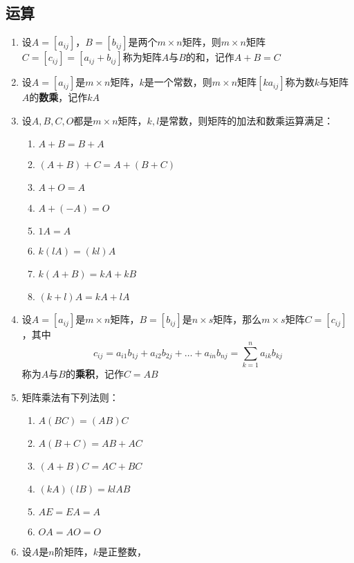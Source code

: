 \documentclass[a4paper,12pt]{article}
\begin{document}
    \subsection{运算}

    \begin{enumerate}
        \item 设$A = [a_{ij}]$，$B = [b_{ij}]$是两个$m \times n$矩阵，则$m \times n$矩阵$C = [c_{ij}] = [a_{ij} + b_{ij}]$称为矩阵$A$与$B$的和，记作$A + B = C$
        \item 设$A = [a_{ij}]$是$m \times n$矩阵，$k$是一个常数，则$m \times n$矩阵$[ka_{ij}]$称为数$k$与矩阵$A$的\textbf{数乘}，记作$kA$
        \item 设$A, B, C, O$都是$m \times n$矩阵，$k, l$是常数，则矩阵的加法和数乘运算满足：
        \begin{enumerate}
            \item $A + B = B + A$
            \item $(A + B) + C = A + (B + C)$
            \item $A + O = A$
            \item $A + (-A) = O$
            \item $1A = A$
            \item $k(lA) = (kl)A$
            \item $k(A + B) = kA + kB$
            \item $(k + l)A = kA + lA$
        \end{enumerate}
        \item 设$A = [a_{ij}]$是$m \times n$矩阵，$B = [b_{ij}]$是$n \times s$矩阵，那么$m \times s$矩阵$C = [c_{ij}]$，其中
        \[
            c_{ij} = a_{i1}b_{1j} + a_{i2}b_{2j} + \dots + a_{in}b_{nj} = \sum_{k=1}^{n} a_{ik}b_{kj}
        \]
        称为$A$与$B$的\textbf{乘积}，记作$C = AB$
        \item 矩阵乘法有下列法则：
        \begin{enumerate}
            \item $A(BC) = (AB)C$
            \item $A(B + C) = AB + AC$
            \item $(A + B)C = AC + BC$
            \item $(kA)(lB) = klAB$
            \item $AE = EA = A$
            \item $OA = AO = O$
        \end{enumerate}
        \item 设$A$是$n$阶矩阵，$k$是正整数，

\end{enumerate}
\end{document}
